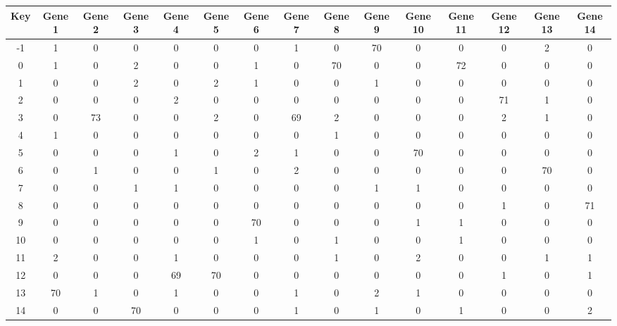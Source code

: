 \begin{tabular}{|c|c|c|c|c|c|c|c|c|c|c|c|c|c|c|}
\hline
Key & Gene 1 & Gene 2 & Gene 3 & Gene 4 & Gene 5 & Gene 6 & Gene 7 & Gene 8 & Gene 9 & Gene 10 & Gene 11 & Gene 12 & Gene 13 & Gene 14 \\
\hline
-1 & 1 & 0 & 0 & 0 & 0 & 0 & 1 & 0 & 70 & 0 & 0 & 0 & 2 & 0 \\
0 & 1 & 0 & 2 & 0 & 0 & 1 & 0 & 70 & 0 & 0 & 72 & 0 & 0 & 0 \\
1 & 0 & 0 & 2 & 0 & 2 & 1 & 0 & 0 & 1 & 0 & 0 & 0 & 0 & 0 \\
2 & 0 & 0 & 0 & 2 & 0 & 0 & 0 & 0 & 0 & 0 & 0 & 71 & 1 & 0 \\
3 & 0 & 73 & 0 & 0 & 2 & 0 & 69 & 2 & 0 & 0 & 0 & 2 & 1 & 0 \\
4 & 1 & 0 & 0 & 0 & 0 & 0 & 0 & 1 & 0 & 0 & 0 & 0 & 0 & 0 \\
5 & 0 & 0 & 0 & 1 & 0 & 2 & 1 & 0 & 0 & 70 & 0 & 0 & 0 & 0 \\
6 & 0 & 1 & 0 & 0 & 1 & 0 & 2 & 0 & 0 & 0 & 0 & 0 & 70 & 0 \\
7 & 0 & 0 & 1 & 1 & 0 & 0 & 0 & 0 & 1 & 1 & 0 & 0 & 0 & 0 \\
8 & 0 & 0 & 0 & 0 & 0 & 0 & 0 & 0 & 0 & 0 & 0 & 1 & 0 & 71 \\
9 & 0 & 0 & 0 & 0 & 0 & 70 & 0 & 0 & 0 & 1 & 1 & 0 & 0 & 0 \\
10 & 0 & 0 & 0 & 0 & 0 & 1 & 0 & 1 & 0 & 0 & 1 & 0 & 0 & 0 \\
11 & 2 & 0 & 0 & 1 & 0 & 0 & 0 & 1 & 0 & 2 & 0 & 0 & 1 & 1 \\
12 & 0 & 0 & 0 & 69 & 70 & 0 & 0 & 0 & 0 & 0 & 0 & 1 & 0 & 1 \\
13 & 70 & 1 & 0 & 1 & 0 & 0 & 1 & 0 & 2 & 1 & 0 & 0 & 0 & 0 \\
14 & 0 & 0 & 70 & 0 & 0 & 0 & 1 & 0 & 1 & 0 & 1 & 0 & 0 & 2 \\
\hline
\end{tabular}